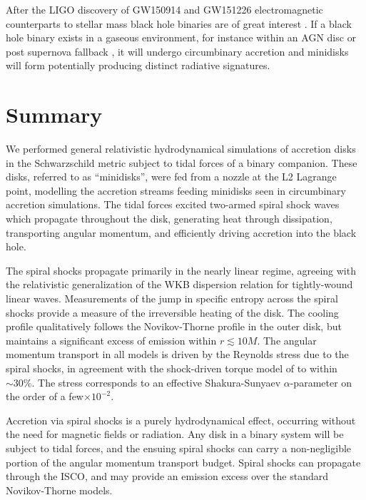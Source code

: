 \documentclass{emulateapj}
\newcommand{\al}{\alpha}
\begin{document}
After the LIGO discovery of GW150914 and GW151226 electromagnetic counterparts to stellar mass black hole binaries are of great interest \citep{LIGO16GW150914Discovery, LIGO16GW151226}.  If a black hole binary exists in a gaseous environment, for instance within an AGN disc \citep{Bartos16, Stone17} or post supernova fallback \citep{Perna16}, it will undergo circumbinary accretion and minidisks will form potentially producing distinct radiative signatures.  



\section{Summary}
\label{sec:summary}


We performed general relativistic hydrodynamical simulations of accretion disks in the Schwarzschild metric subject to tidal forces of a binary companion.  These disks, referred to as ``minidisks'', were fed from a nozzle at the L2 Lagrange point, modelling the accretion streams feeding minidisks seen in circumbinary accretion simulations.  The tidal forces excited two-armed spiral shock waves which propagate throughout the disk,  generating heat through dissipation, transporting angular momentum, and efficiently driving accretion into the black hole.

The spiral shocks propagate primarily in the nearly linear regime, agreeing with the relativistic generalization of the WKB dispersion relation for tightly-wound linear waves.  Measurements of the jump in specific entropy across the spiral shocks provide a measure of the irreversible heating of the disk.  The cooling profile qualitatively follows the Novikov-Thorne profile in the outer disk, but maintains a significant excess of emission within $r \lesssim 10 M$.  The angular momentum transport in all models is driven by the Reynolds stress due to the spiral shocks, in agreement with the shock-driven torque model of \citep{Rafikov16} to within $\sim30\%$.  The stress corresponds to an effective Shakura-Sunyaev $\al$-parameter on the order of a few$\times 10^{-2}$.

Accretion via spiral shocks is a purely hydrodynamical effect, occurring without the need for magnetic fields or radiation.  Any disk in a binary system will be subject to tidal forces, and the ensuing spiral shocks can carry a non-negligible portion of the angular momentum transport budget.  Spiral shocks can propagate through the ISCO, and may provide an emission excess over the standard Novikov-Thorne models.
\end{document}
